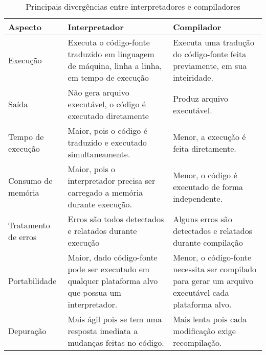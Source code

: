 \begin{table}[htbp]
    \centering
    \caption{Principais divergências entre interpretadores e compiladores}
    \label{tab:comparacaoInterpreterCompiler}
    \begin{tabularx}{\linewidth}{ | l | >{\RaggedRight\arraybackslash}X | >{\RaggedRight\arraybackslash}X | }
        \hline
        \textbf{Aspecto} & \textbf{Interpretador} & \textbf{Compilador} \\
        \hline
        Execução &
        Executa o código-fonte traduzido em linguagem de máquina, linha a
        linha, em tempo de execução &
        Executa uma tradução do código-fonte feita previamente, em sua
        inteiridade. \\
        \hline
        Saída &
        Não gera arquivo executável, o código é executado diretamente &
        Produz arquivo executável. \\
        \hline
        Tempo de execução &
        Maior, pois o código é traduzido e executado simultaneamente. &
        Menor, a execução é feita diretamente. \\
        \hline
        Consumo de memória &
        Maior, pois o interpretador precisa ser carregado a memória durante
        execução. &
        Menor, o código é executado de forma independente. \\
        \hline
        Tratamento de erros &
        Erros são todos detectados e relatados durante execução &
        Alguns erros são detectados e relatados durante compilação \\ 
        \hline
        Portabilidade &
        Maior, dado código-fonte pode ser executado em qualquer plataforma
        alvo que possua um interpretador. &
        Menor, o código-fonte necessita ser compilado para gerar um arquivo
        executável cada plataforma alvo. \\
        \hline
        Depuração &
        Mais ágil pois se tem uma resposta imediata a mudanças feitas no
        código. &
        Mais lenta pois cada modificação exige recompilação. \\
        \hline
    \end{tabularx}
\end{table}


